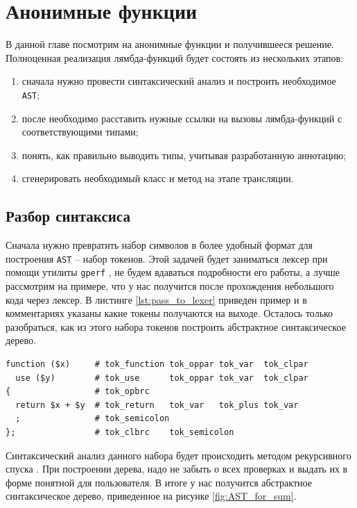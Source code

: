 \section{Анонимные функции}
В данной главе посмотрим на анонимные функции и получившееся решение.
Полноценная реализация лямбда-функций будет состоять из нескольких этапов:
\begin{enumerate}
  \item сначала нужно провести синтаксический анализ и построить необходимое \verb|AST|;
  \item после необходимо расставить нужные ссылки на вызовы лямбда-функций с соответствующими типами;
  \item понять, как правильно выводить типы, учитывая разработанную аннотацию;
  \item сгенерировать необходимый класс и метод на этапе трансляции.
\end{enumerate}

\subsection{Разбор синтаксиса}
Сначала нужно превратить набор символов в более удобный формат для построения \verb|AST| -- набор токенов.
Этой задачей будет заниматься лексер при помощи утилиты \verb|gperf| \cite[с.~461]{cpp_gems_gperf}, не будем вдаваться подробности его работы, а лучше рассмотрим на примере, что у нас получится после прохождения небольшого кода через лексер.
В листинге \ref{lst:pass_to_lexer} приведен пример и в комментариях указаны какие токены получаются на выходе.
Осталось только разобраться, как из этого набора токенов построить абстрактное синтаксическое дерево.
\begin{lstlisting}[caption={Результат работы лексера},label={lst:pass_to_lexer}]
function ($x)     # tok_function tok_oppar tok_var  tok_clpar
  use ($y)        # tok_use      tok_oppar tok_var  tok_clpar
{                 # tok_opbrc
  return $x + $y  # tok_return   tok_var   tok_plus tok_var
  ;               # tok_semicolon
};                # tok_clbrc    tok_semicolon
\end{lstlisting}

Синтаксический анализ данного набора будет происходить методом рекурсивного спуска \cite{recursive_descent_parser}.
При построении дерева, надо не забыть о всех проверках и выдать их в форме понятной для пользователя.
В итоге у нас получится абстрактное синтаксическое дерево, приведенное на рисунке \ref{fig:AST_for_sum}.


